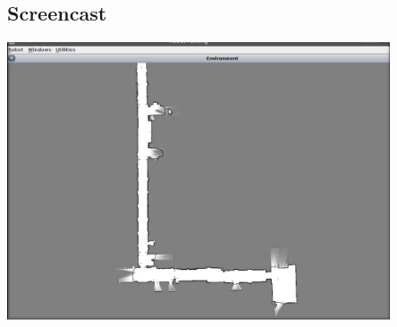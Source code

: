 \subsection{Screencast}
\begin{frame}
 \centering
 \includegraphics[width=0.85\textwidth]{./material/screencast.png}
\end{frame}


